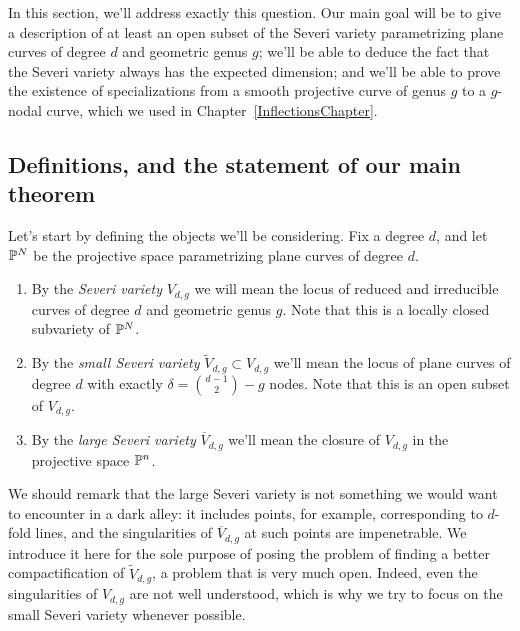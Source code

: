 In this section, we'll address exactly this question. Our main goal will be to give a description of at least an open subset of the Severi variety parametrizing plane curves of degree $d$ and geometric genus $g$; we'll be able to deduce the fact that the Severi variety always has the expected dimension; and we'll be able to prove the existence of specializations from a smooth projective curve of genus $g$ to a $g$-nodal curve, which we used in Chapter~\ref{InflectionsChapter}.

\subsection{Definitions, and the statement of our main theorem}

Let's start by defining the objects we'll be considering. Fix a degree $d$, and let ${\mathbb P}^N$ be the projective space parametrizing plane curves of degree $d$.

\begin{definition} 
\begin{enumerate}
\item By the \emph{Severi variety} $V_{d,g}$ we will mean the locus of reduced and irreducible curves of degree $d$ and geometric genus $g$. Note that this is a locally closed subvariety of ${\mathbb P}^N$.

\item By the \emph{small Severi variety} $\tilde V_{d,g} \subset V_{d,g}$ we'll mean the locus of plane curves of degree $d$ with exactly $\delta = \binom{d-1}{2} - g$ nodes. Note that this is an open subset of $V_{d,g}$.

\item By the \emph{large Severi variety} $\overline V_{d,g}$ we'll mean the closure of $V_{d,g}$ in the projective space ${\mathbb P}^n$.
\end{enumerate}
\end{definition}

We should remark that the large Severi variety is not something we would want to encounter in a dark alley: it includes points, for example, corresponding to $d$-fold lines, and the singularities of $\overline V_{d,g}$ at such points are impenetrable. We introduce it here for the sole purpose of posing the problem of finding a better compactification of $\tilde V_{d,g}$, a problem that is very much open. Indeed, even the singularities of $V_{d,g}$  are not well understood, which is why we try to focus on the small Severi variety whenever possible.

